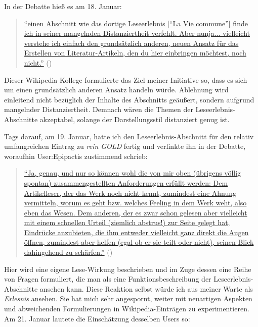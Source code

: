 \documentclass[fontsize=12pt]{scrartcl}
\begin{document}
In der Debatte hie{\ss} es am 18. Januar:

\singlespacing
\begin{quote}
\href{https://de.wikipedia.org/w/index.php?title=Benutzer_Diskussion:Grillenwaage\&diff=next\&oldid=137891471}{"`einen Abschnitt wie das dortige Leseerlebnis ["`La Vie commune"'] finde ich in seiner mangelnden Distanziertheit verfehlt. Aber nunja... vielleicht verstehe ich einfach den grunds\"atzlich anderen, neuen Ansatz f\"ur das Erstellen von Li\-te\-ra\-tur-Artikeln, den du \mbox{hier} einbringen m\"ochtest, noch nicht."'} (\cite{UserGestumblindi2015})
\end{quote}
\onehalfspacing

Dieser Wi\-ki\-pe\-dia-Kollege\textsuperscript{\tiny *} formulierte das Ziel meiner Initiative so, dass es sich um einen grunds\"atzlich anderen Ansatz handeln w\"urde. Ablehnung wird einlei\-tend nicht bez\"uglich der Inhalte des Abschnitts ge\"au{\ss}ert, sondern aufgrund mangelnder Distanziertheit. Demnach w\"aren die Themen der Leseerlebnis-Abschnitte akzeptabel, solange der Darstellungsstil distanziert genug ist. 

Tags darauf, am 19. Januar, hatte ich den Leseerlebnis-Abschnitt f\"ur den relativ umfangreichen Eintrag zu \textit{rein GOLD} fertig und verlinkte ihn in der Debatte, woraufhin \mbox{User}:Epipactis zustimmend schrieb: 

\singlespacing
\begin{quote}
\href{https://de.wikipedia.org/w/index.php?title=Benutzer_Diskussion:Grillenwaage\&diff=137961506\&oldid=137943802}{"`Ja, genau, und nur so k\"onnen wohl die von mir oben (\"ubrigens v\"ollig spontan) zusammengestellten \flq Anforderungen\frq \,\,erf\"ullt werden: Dem Artikelleser, der das Werk noch nicht kennt, zumindest eine Ahnung vermitteln, \flq worum es geht\frq \,\,bzw. welches \flq Feeling\frq \,\,in dem Werk weht, also eben das \flq Wesen\frq .\,\,Dem anderen, der es zwar schon gelesen aber viel\-leicht mit einem schnellen Urteil (\flq ziemlich abstrus!\frq ) zur Seite gelegt hat, Eindr\"ucke anzubieten, die ihm ent\-weder vielleicht ganz direkt die Augen \"offnen, zumindest aber helfen (egal ob er sie teilt oder nicht), seinen Blick dahingehend zu sch\"arfen."'} (\cite{UserEpipactis2015b})
\end{quote}
\onehalfspacing

Hier wird eine eigene Lese-Wirkung beschrieben und im Zuge dessen eine Reihe von Fragen formuliert, die man als eine Funktionsbeschreibung der Leseerlebnis-Abschnitte ansehen kann. Diese Reaktion \mbox{selbst} w\"urde ich aus meiner Warte als \textit{Erlesnis} ansehen. Sie hat mich sehr angespornt, weiter mit neuartigen Aspekten und abweichenden Formulierungen in Wi\-ki\-pe\-dia-Eintr\"agen zu experimentieren. Am 21. Januar lautete die Einsch\"atzung desselben Users so: 
\end{document}
